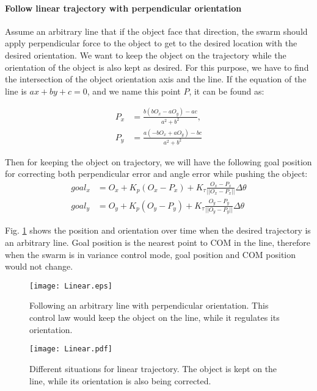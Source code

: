 \paragraph{Follow linear trajectory with perpendicular orientation} \label{para:PureTranslation}

Assume an arbitrary line that if the object face that direction, the swarm should apply perpendicular force to the object to get to the desired location with the desired orientation.  We want to keep the object on the trajectory while the orientation of the object is also kept as desired. For this purpose, we have to find the intersection of the object orientation axis and the line. If the equation of the line is $ax+by+c =0$, and we name this point $P$, it can be found as:

\begin{align}
P_x &= \frac{b(bO_x-aO_y)-ac}{a^2 + b^2},\\ \nonumber
P_y &= \frac{a(-bO_x+aO_y)-bc}{a^2 + b^2}
\end{align}

Then for keeping the object on trajectory, we will have the following goal position for correcting both perpendicular error and angle error while pushing the object:
\begin{align}
goal_x &= O_x+ K_p (O_x-P_x)+ K_\tau \frac{O_x-P_x}{||O_x-P_x||}\Delta\theta \nonumber \\
goal_y &= O_y+ K_p (O_y-P_y)+ K_\tau \frac{O_y-P_y}{||O_y-P_y||}\Delta\theta \label{eq:Regulate}
\end{align}

Fig. \ref{fig:Linear} shows the position and orientation over time when the desired trajectory is an arbitrary line. Goal position is the nearest point to COM in the line, therefore when the swarm is in variance control mode, goal position and COM position would not change. 

\begin{figure}
\begin{center}
	\texttt{[image: Linear.eps]}
\end{center}
\vspace{-2em}
\caption{\label{fig:Linear} 
Following an arbitrary line with perpendicular orientation. This control law would keep the object on the line, while it regulates its orientation.
}
\vspace{-1em}
\end{figure}

\begin{figure*}
\centering

\texttt{[image: Linear.pdf]}
\vspace{0em}
\caption{\label{fig:LinearScreenShots}
Different situations for linear trajectory. The object is kept on the line, while its orientation is also being corrected.
}
\end{figure*}

